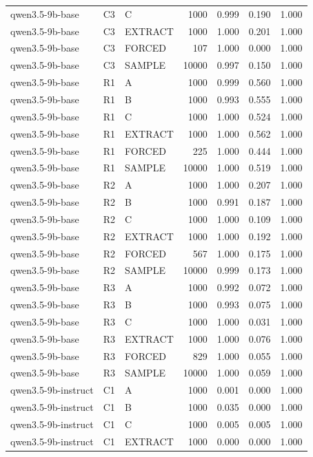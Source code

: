 \begin{table}
\begin{tabular}{lllrrrr}
qwen3.5-9b-base & C3 & C & 1000 & 0.999 & 0.190 & 1.000 \\
qwen3.5-9b-base & C3 & EXTRACT & 1000 & 1.000 & 0.201 & 1.000 \\
qwen3.5-9b-base & C3 & FORCED & 107 & 1.000 & 0.000 & 1.000 \\
qwen3.5-9b-base & C3 & SAMPLE & 10000 & 0.997 & 0.150 & 1.000 \\
qwen3.5-9b-base & R1 & A & 1000 & 0.999 & 0.560 & 1.000 \\
qwen3.5-9b-base & R1 & B & 1000 & 0.993 & 0.555 & 1.000 \\
qwen3.5-9b-base & R1 & C & 1000 & 1.000 & 0.524 & 1.000 \\
qwen3.5-9b-base & R1 & EXTRACT & 1000 & 1.000 & 0.562 & 1.000 \\
qwen3.5-9b-base & R1 & FORCED & 225 & 1.000 & 0.444 & 1.000 \\
qwen3.5-9b-base & R1 & SAMPLE & 10000 & 1.000 & 0.519 & 1.000 \\
qwen3.5-9b-base & R2 & A & 1000 & 1.000 & 0.207 & 1.000 \\
qwen3.5-9b-base & R2 & B & 1000 & 0.991 & 0.187 & 1.000 \\
qwen3.5-9b-base & R2 & C & 1000 & 1.000 & 0.109 & 1.000 \\
qwen3.5-9b-base & R2 & EXTRACT & 1000 & 1.000 & 0.192 & 1.000 \\
qwen3.5-9b-base & R2 & FORCED & 567 & 1.000 & 0.175 & 1.000 \\
qwen3.5-9b-base & R2 & SAMPLE & 10000 & 0.999 & 0.173 & 1.000 \\
qwen3.5-9b-base & R3 & A & 1000 & 0.992 & 0.072 & 1.000 \\
qwen3.5-9b-base & R3 & B & 1000 & 0.993 & 0.075 & 1.000 \\
qwen3.5-9b-base & R3 & C & 1000 & 1.000 & 0.031 & 1.000 \\
qwen3.5-9b-base & R3 & EXTRACT & 1000 & 1.000 & 0.076 & 1.000 \\
qwen3.5-9b-base & R3 & FORCED & 829 & 1.000 & 0.055 & 1.000 \\
qwen3.5-9b-base & R3 & SAMPLE & 10000 & 1.000 & 0.059 & 1.000 \\
qwen3.5-9b-instruct & C1 & A & 1000 & 0.001 & 0.000 & 1.000 \\
qwen3.5-9b-instruct & C1 & B & 1000 & 0.035 & 0.000 & 1.000 \\
qwen3.5-9b-instruct & C1 & C & 1000 & 0.005 & 0.005 & 1.000 \\
qwen3.5-9b-instruct & C1 & EXTRACT & 1000 & 0.000 & 0.000 & 1.000 \\

\end{tabular}
\end{table}

